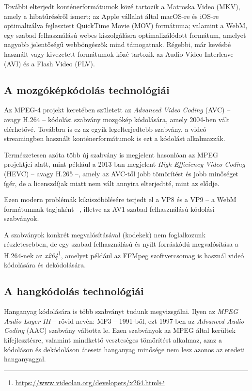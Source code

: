 További elterjedt konténerformátumok közé tartozik a Matroska Video (MKV), amely a hibatűréséről ismert; az Apple vállalat által macOS-re és iOS-re optimalizálva fejlesztett QuickTime Movie (MOV) formátuma; valamint a WebM, egy szabad felhasználású webes kiszolgálásra optimalizálódott formátum, amelyet nagyobb jelentőségű webböngészők mind támogatnak. Régebbi, már kevésbé használt vagy kivezetett formátumok közé tartozik az Audio Video Interleave (AVI) és a Flash Video (FLV).

\subsection{A mozgóképkódolás technológiái}

Az MPEG-4 projekt keretében született az \emph{Advanced Video Coding} (AVC) -- avagy H.264 -- kódolási szabvány mozgókép kódolására, amely 2004-ben vált elérhetővé. Továbbra is ez az egyik legelterjedtebb szabvány, a videó streamingben használt konténerformátumok is ezt a kódolást alkalmazzák.

Természetesen azóta több új szabvány is megjelent hasonlóan az MPEG projektjei alatt, mint például a 2013-ban megjelent \emph{High Efficiency Video Coding} (HEVC) -- avagy H.265 --, amely az AVC-től jobb tömörítést és jobb minőséget ígér, de a licenszdíjak miatt nem vált annyira elterjedtté, mint az elődje.

Ezen modern problémák kiküszöbölésére terjedt el a VP8 és a VP9 -- a WebM formátumnak tagjaként --, illetve az AV1 szabad felhasználású kódolási szabványok.

A szabványok konkrét megvalósításával (kodekek) nem foglalkozunk részletesebben, de egy szabad felhasználású és nyílt forráskódú megvalósítása a H.264-nek az \emph{x264}\footnote{\url{https://www.videolan.org/developers/x264.html}}, amelyet például az FFMpeg szoftvercsomag is használ videó kódolására és dekódolására.

\subsection{A hangkódolás technológiái}

Hanganyag kódolására is több szabványt tudunk megvizsgálni. Ilyen az \emph{MPEG Audio Layer III} -- rövid nevén: MP3 -- 1991-ből, ezt 1997-ben az \emph{Advanced Audio Coding} (AAC) szabvány váltotta le. Ezen szabványok az MPEG által kerültek kifejlesztésre, valamint mindkettő veszteséges tömörítést alkalmaz, azaz a kódoláson és dekódoláson átesett hanganyag minősége nem lesz azonos az eredeti hanganyaggal.

